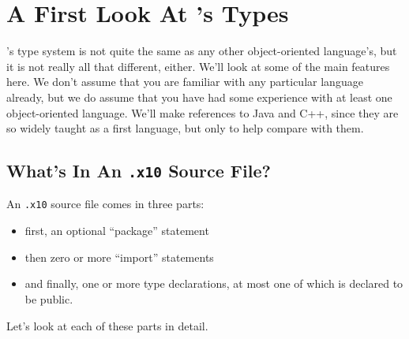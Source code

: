 \chapter{A First Look At \Xten's Types}\label{chp:types}

\Xten's type system is not quite the same as any other object-oriented
language's, but it is not really all that different, either. We'll look at
some of the main features here. We don't assume that you are familiar with any
particular language already, but we do assume that you have had some
experience with at least one object-oriented language. We'll make references
to Java and C++, since they are so widely taught as a first language, but only
to help compare \Xten{} with them.

\section{What's In An {\tt .x10} Source File?}
An {\tt .x10} source file comes in three parts:
\begin{itemize}
\item first, an optional ``package'' statement
\item then zero or more ``import''  statements
\item and finally, one or more type declarations, at most one of which is declared to be public.
\end{itemize}
Let's look at each of these parts in detail.
